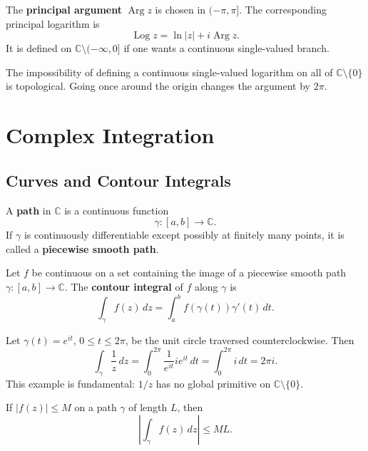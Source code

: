 \begin{definition}
The \textbf{principal argument} $\operatorname{Arg}z$ is chosen in $(-\pi,\pi]$. The corresponding principal logarithm is
\[
    \operatorname{Log}z=\ln|z|+i\operatorname{Arg}z.
\]
It is defined on $\mathbb{C}\setminus(-\infty,0]$ if one wants a continuous single-valued branch.
\end{definition}

\begin{remark}
The impossibility of defining a continuous single-valued logarithm on all of $\mathbb{C}\setminus\{0\}$ is topological. Going once around the origin changes the argument by $2\pi$.
\end{remark}

\section{Complex Integration}

\subsection{Curves and Contour Integrals}

\begin{definition}[Path]
A \textbf{path} in $\mathbb{C}$ is a continuous function
\[
    \gamma:[a,b]\to\mathbb{C}.
\]
If $\gamma$ is continuously differentiable except possibly at finitely many points, it is called a \textbf{piecewise smooth path}.
\end{definition}

\begin{definition}
Let $f$ be continuous on a set containing the image of a piecewise smooth path $\gamma:[a,b]\to\mathbb{C}$. The \textbf{contour integral} of $f$ along $\gamma$ is
\[
    \int_\gamma f(z)\,dz=\int_a^b f(\gamma(t))\gamma'(t)\,dt.
\]
\end{definition}

\begin{example}
Let $\gamma(t)=e^{it}$, $0\leq t\leq 2\pi$, be the unit circle traversed counterclockwise. Then
\[
    \int_\gamma \frac{1}{z}\,dz
    =\int_0^{2\pi}\frac{1}{e^{it}}ie^{it}\,dt
    =\int_0^{2\pi} i\,dt
    =2\pi i.
\]
This example is fundamental: $1/z$ has no global primitive on $\mathbb{C}\setminus\{0\}$.
\end{example}

\begin{proposition}
If $|f(z)|\leq M$ on a path $\gamma$ of length $L$, then
\[
    \left|\int_\gamma f(z)\,dz\right|\leq ML.
\]
\end{proposition}

